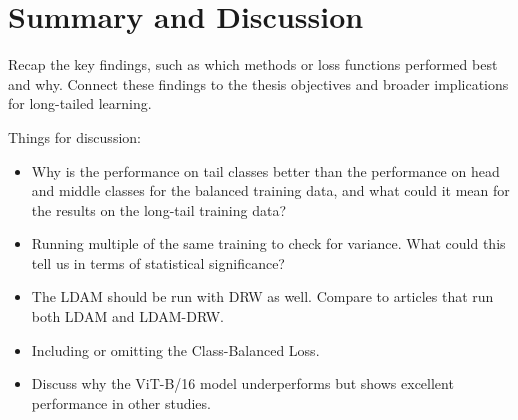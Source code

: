 


\section{Summary and Discussion}
Recap the key findings, such as which methods or loss functions performed best and why.
Connect these findings to the thesis objectives and broader implications for long-tailed learning.

Things for discussion:

\begin{itemize}
    \item Why is the performance on tail classes better than the performance on head and middle classes for the balanced training data, and what could it mean for the results on the long-tail training data?
    \item Running multiple of the same training to check for variance. What could this tell us in terms of statistical significance?
    \item The LDAM should be run with DRW as well. Compare to articles that run both LDAM and LDAM-DRW.
    \item Including or omitting the Class-Balanced Loss.
    \item Discuss why the ViT-B/16 model underperforms but shows excellent performance in other studies.
\end{itemize}